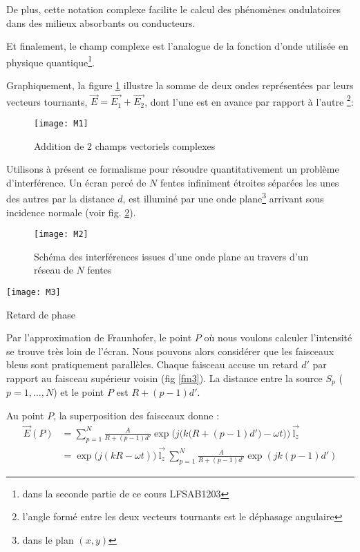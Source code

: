 De plus,  cette notation complexe facilite le calcul des phénomènes ondulatoires dans des milieux absorbants ou conducteurs. 

Et finalement, le champ complexe est l'analogue de la fonction d'onde utilisée en physique quantique\footnote{dans la seconde partie de ce cours LFSAB1203}.

Graphiquement, la figure \ref{M1} illustre la somme de deux ondes représentées par leurs vecteurs tournants, $\overset\rightarrow{E}=\overset\rightarrow{E_1}+\overset\rightarrow{E_2}$, dont l'une est en avance par rapport à l'autre \footnote{l'angle formé entre les deux vecteurs tournants est le déphasage angulaire}:
\begin{figure}[htb]
\centering
\texttt{[image: M1]}
\caption{Addition de 2 champs vectoriels complexes}
\label{M1}
\end{figure}

Utilisons à présent ce formalisme pour résoudre quantitativement un problème d'interférence. Un écran percé de $N$ fentes infiniment étroites séparées les unes des autres par la distance $d$, est illuminé par une onde plane\footnote{dans le plan $(x,y)$} arrivant sous incidence normale (voir fig. \ref{M2}).
\begin{figure}[htb]
\centering
\texttt{[image: M2]}
\caption{Schéma des interférences issues d'une onde plane au travers d'un réseau de $N$ fentes}
\label{M2}
\end{figure}

\begin{marginfigure}[0cm]
	\texttt{[image: M3]}
	\caption{Retard de phase}
	\label{fm3}
\end{marginfigure}

Par l'approximation de Fraunhofer, le point $P$ où nous voulons calculer l'intensité se trouve très loin de l'écran. Nous pouvons alors considérer que les faisceaux bleus sont pratiquement parallèles. Chaque faisceau accuse un retard $d'$ par rapport au faisceau supérieur voisin (fig \ref{fm3}). La distance entre la source $S_p$ ($p=1,\ldots, N$) et le point $P$ est $R+(p-1)d'$.

Au point $P$, la superposition des faisceaux donne :
\begin{align*}
\overset\rightarrow{E}(P) & = \sum\limits_{p=1}^N \frac{A}{R+(p-1)d'}\exp\bigg(j\Big(k\big(R+(p-1)d'\big)-\omega t\Big)\bigg)\:\overset\rightarrow{\mbox{l}_z} \\
& = \exp\Big(j(kR-\omega t)\Big)\:\overset\rightarrow{\mbox{l}_z}\: \sum\limits_{p=1}^N \frac{A}{R+(p-1)d'}\exp(jk(p-1)d')
\end{align*}

